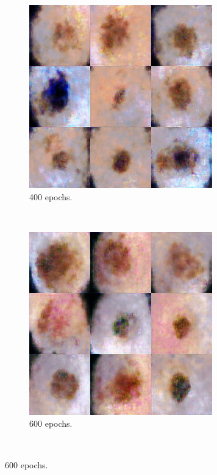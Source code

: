 \documentclass[conference]{IEEEtran}
\begin{document}
\begin{figure}
\begin{subfigure}[t]{0.15\textwidth}
        \includegraphics[width=\textwidth]{5.png}
        \caption{400 epochs.}
        \label{fig:2}
    \end{subfigure}
~
    \begin{subfigure}[t]{0.15\textwidth}
             \centering

        \includegraphics[width=\textwidth]{6.png}
        \caption{600 epochs.}
        \label{fig:3}
    \end{subfigure} 
  ~     
   

\end{figure}
\end{document}
